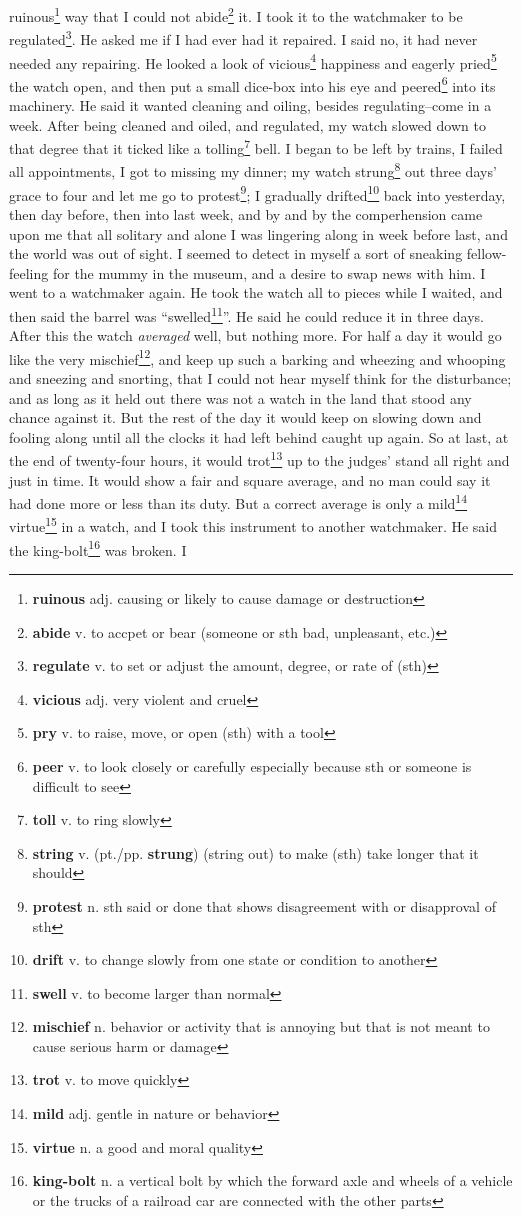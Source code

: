 ruinous\footnote{\textbf{ruinous} adj. causing or likely to cause damage or destruction} way that I could not abide\footnote{\textbf{abide} v. to accpet or bear (someone or sth bad, unpleasant, etc.)} it. I took it to the watchmaker to be regulated\footnote{\textbf{regulate} v. to set or adjust the amount, degree, or rate of (sth)}. He asked me if I had ever had it repaired. I said no, it had never needed any repairing. He looked a look of vicious\footnote{\textbf{vicious} adj. very violent and cruel} happiness and eagerly pried\footnote{\textbf{pry} v. to raise, move, or open (sth) with a tool} the watch open, and then put a small dice-box into his eye and peered\footnote{\textbf{peer} v. to look closely or carefully especially because sth or someone is difficult to see} into its machinery. He said it wanted cleaning and oiling, besides regulating--come in a week. After being cleaned and oiled, and regulated, my watch slowed down to that degree that it ticked like a tolling\footnote{\textbf{toll} v. to ring slowly} bell. I began to be left by trains, I failed all appointments, I got to missing my dinner; my watch strung\footnote{\textbf{string} v. (pt./pp. \textbf{strung}) (string out) to make (sth) take longer that it should} out three days' grace to four and let me go to protest\footnote{\textbf{protest} n. sth said or done that shows disagreement with or disapproval of sth}; I gradually drifted\footnote{\textbf{drift} v. to change slowly from one state or condition to another} back into yesterday, then day before, then into last week, and by and by the comperhension came upon me that all solitary and alone I was lingering along in week before last, and the world was out of sight. I seemed to detect in myself a sort of sneaking fellow-feeling for the mummy in the museum, and a desire to swap news with him. I went to a watchmaker again. He took the watch all to pieces while I waited, and then said the barrel was ``swelled\footnote{\textbf{swell} v. to become larger than normal}''. He said he could reduce it in three days. After this the watch \textit{averaged} well, but nothing more. For half a day it would go like the very mischief\footnote{\textbf{mischief} n. behavior or activity that is annoying but that is not meant to cause serious harm or damage}, and keep up such a barking and wheezing and whooping and sneezing and snorting, that I could not hear myself think for the disturbance; and as long as it held out there was not a watch in the land that stood any chance against it. But the rest of the day it would keep on slowing down and fooling along until all the clocks it had left behind caught up again. So at last, at the end of twenty-four hours, it would trot\footnote{\textbf{trot} v. to move quickly} up to the judges' stand all right and just in time. It would show a fair and square average, and no man could say it had done more or less than its duty. But a correct average is only a mild\footnote{\textbf{mild} adj. gentle in nature or behavior} virtue\footnote{\textbf{virtue} n. a good and moral quality} in a watch, and I took this instrument to another watchmaker. He said the king-bolt\footnote{\textbf{king-bolt} n. a vertical bolt by which the forward axle and wheels of a vehicle or the trucks of a railroad car are connected with the other parts} was broken. I 